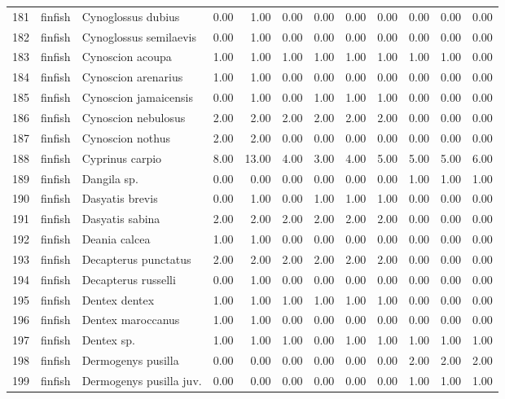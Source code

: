 \begin{table}[ht]
\begin{tabular}{rllrrrrrrrrr}
  181 & finfish & Cynoglossus dubius & 0.00 & 1.00 & 0.00 & 0.00 & 0.00 & 0.00 & 0.00 & 0.00 & 0.00 \\ 
  182 & finfish & Cynoglossus semilaevis & 0.00 & 1.00 & 0.00 & 0.00 & 0.00 & 0.00 & 0.00 & 0.00 & 0.00 \\ 
  183 & finfish & Cynoscion acoupa & 1.00 & 1.00 & 1.00 & 1.00 & 1.00 & 1.00 & 1.00 & 1.00 & 0.00 \\ 
  184 & finfish & Cynoscion arenarius & 1.00 & 1.00 & 0.00 & 0.00 & 0.00 & 0.00 & 0.00 & 0.00 & 0.00 \\ 
  185 & finfish & Cynoscion jamaicensis & 0.00 & 1.00 & 0.00 & 1.00 & 1.00 & 1.00 & 0.00 & 0.00 & 0.00 \\ 
  186 & finfish & Cynoscion nebulosus & 2.00 & 2.00 & 2.00 & 2.00 & 2.00 & 2.00 & 0.00 & 0.00 & 0.00 \\ 
  187 & finfish & Cynoscion nothus & 2.00 & 2.00 & 0.00 & 0.00 & 0.00 & 0.00 & 0.00 & 0.00 & 0.00 \\ 
  188 & finfish & Cyprinus carpio & 8.00 & 13.00 & 4.00 & 3.00 & 4.00 & 5.00 & 5.00 & 5.00 & 6.00 \\ 
  189 & finfish & Dangila sp. & 0.00 & 0.00 & 0.00 & 0.00 & 0.00 & 0.00 & 1.00 & 1.00 & 1.00 \\ 
  190 & finfish & Dasyatis brevis & 0.00 & 1.00 & 0.00 & 1.00 & 1.00 & 1.00 & 0.00 & 0.00 & 0.00 \\ 
  191 & finfish & Dasyatis sabina & 2.00 & 2.00 & 2.00 & 2.00 & 2.00 & 2.00 & 0.00 & 0.00 & 0.00 \\ 
  192 & finfish & Deania calcea & 1.00 & 1.00 & 0.00 & 0.00 & 0.00 & 0.00 & 0.00 & 0.00 & 0.00 \\ 
  193 & finfish & Decapterus punctatus & 2.00 & 2.00 & 2.00 & 2.00 & 2.00 & 2.00 & 0.00 & 0.00 & 0.00 \\ 
  194 & finfish & Decapterus russelli & 0.00 & 1.00 & 0.00 & 0.00 & 0.00 & 0.00 & 0.00 & 0.00 & 0.00 \\ 
  195 & finfish & Dentex dentex & 1.00 & 1.00 & 1.00 & 1.00 & 1.00 & 1.00 & 0.00 & 0.00 & 0.00 \\ 
  196 & finfish & Dentex maroccanus & 1.00 & 1.00 & 0.00 & 0.00 & 0.00 & 0.00 & 0.00 & 0.00 & 0.00 \\ 
  197 & finfish & Dentex sp. & 1.00 & 1.00 & 1.00 & 0.00 & 1.00 & 1.00 & 1.00 & 1.00 & 1.00 \\ 
  198 & finfish & Dermogenys pusilla & 0.00 & 0.00 & 0.00 & 0.00 & 0.00 & 0.00 & 2.00 & 2.00 & 2.00 \\ 
  199 & finfish & Dermogenys pusilla juv. & 0.00 & 0.00 & 0.00 & 0.00 & 0.00 & 0.00 & 1.00 & 1.00 & 1.00 \\ 

\end{tabular}
\end{table}
